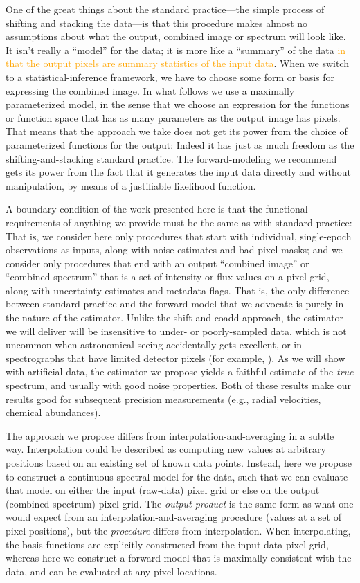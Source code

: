 \documentclass[modern, linenumbers]{aastex631}
\newcommand{\modified}[1]{\textcolor{orange}{#1}}
\begin{document}
One of the great things about the standard practice---the simple process of shifting and stacking the data---is that this procedure makes almost no assumptions about what the output, combined image or spectrum will look like.
It isn't really a ``model'' for the data; it is more like a ``summary'' of the data \modified{in that the output pixels are summary statistics of the input data}.
When we switch to a statistical-inference framework, we have to choose some form or basis for expressing the combined image.
In what follows we use a maximally parameterized model, in the sense that we choose an expression for the functions or function space that has as many parameters as the output image has pixels.
That means that the approach we take does not get its power from the choice of parameterized functions for the output:
Indeed it has just as much freedom as the shifting-and-stacking standard practice.
The forward-modeling we recommend gets its power from the fact that it generates the input data directly and without manipulation, by means of a justifiable likelihood function.

A boundary condition of the work presented here is that the functional requirements of anything we provide must be the same as with standard practice:
That is, we consider here only procedures that start with individual, single-epoch observations as inputs, along with noise estimates and bad-pixel masks; and we consider only procedures that end with an output ``combined image'' or ``combined spectrum'' that is a set of intensity or flux values on a pixel grid, along with uncertainty estimates and metadata flags.
That is, the only difference between standard practice and the forward model that we advocate is purely in the nature of the estimator.
Unlike the shift-and-coadd approach, the estimator we will deliver will be insensitive to under- or poorly-sampled data, which is not uncommon when astronomical seeing accidentally gets excellent, or in spectrographs that have limited detector pixels (for example, \citealt{apogeehardware}).
As we will show with artificial data, the estimator we propose yields a faithful estimate of the \emph{true} spectrum, and usually with good noise properties.
Both of these results make our results good for subsequent precision measurements (e.g., radial velocities, chemical abundances).

The approach we propose differs from interpolation-and-averaging in a subtle way.
Interpolation could be described as computing new values at arbitrary positions based on an existing set of known data points.
Instead, here we propose to construct a continuous spectral model for the data, such that we can evaluate that model on either the input (raw-data) pixel grid or else on the output (combined spectrum) pixel grid.
The \emph{output product} is the same form as what one would expect from an interpolation-and-averaging procedure (values at a set of pixel positions), but the \emph{procedure} differs from interpolation. When interpolating, the basis functions are explicitly constructed from the input-data pixel grid, whereas here we construct a forward model that is maximally consistent with the data, and can be evaluated at any pixel locations.
\end{document}
